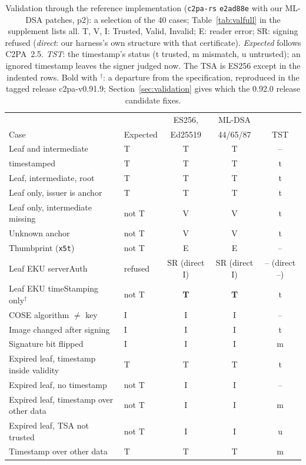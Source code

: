 \begin{table}[t]
\caption{Validation through the reference implementation (\texttt{c2pa-rs} \texttt{e2ad88e} with our ML-DSA patches, p2): a selection of the 40 cases; Table~\ref{tab:valfull} in the supplement lists all. T, V, I: Trusted, Valid, Invalid; E: reader error; SR: signing refused (\emph{direct}: our harness's own structure with that certificate). \emph{Expected} follows C2PA~2.5. \emph{TST}: the timestamp's status (t trusted, m mismatch, u untrusted); an ignored timestamp leaves the signer judged now. The TSA is ES256 except in the indented rows. Bold with $^\dagger$: a departure from the specification, reproduced in the tagged release c2pa-v0.91.9; Section~\ref{sec:validation} gives which the 0.92.0 release candidate fixes.}
\label{tab:validation}
\footnotesize
\setlength{\tabcolsep}{3pt}
\begin{tabular}{llccc}
\toprule
 & & ES256, & ML-DSA & \\
Case & Expected & Ed25519 & 44/65/87 & TST\\
\midrule
Leaf and intermediate & T & T & T & --\\
\quad timestamped & T & T & T & t\\
Leaf, intermediate, root & T & T & T & t\\
Leaf only, issuer is anchor & T & T & T & t\\
Leaf only, intermediate missing & not T & V & V & t\\
Unknown anchor & not T & V & V & t\\
Thumbprint (\texttt{x5t}) & not T & E & E & --\\
Leaf EKU serverAuth & refused & SR (direct I) & SR (direct I) & -- (direct --)\\
Leaf EKU timeStamping only$^\dagger$ & not T & \textbf{T} & \textbf{T} & t\\
COSE algorithm $\neq$ key & I & I & I & --\\
Image changed after signing & I & I & I & t\\
Signature bit flipped & I & I & I & m\\
Expired leaf, timestamp inside validity & T & T & T & t\\
Expired leaf, no timestamp & not T & I & I & --\\
Expired leaf, timestamp over other data & not T & I & I & m\\
Expired leaf, TSA not trusted & not T & I & I & u\\
Timestamp over other data & T & T & T & m\\

\end{tabular}
\end{table}
